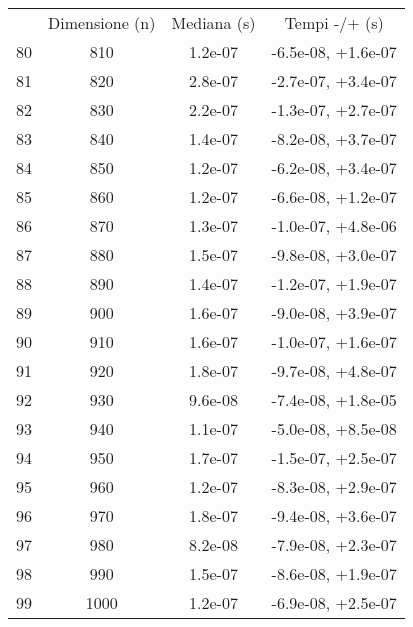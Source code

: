 \begin{table}
\centering
\begin{adjustbox}{width=1\textwidth/2}
\begin{tabular}{|c|c|c|c|}
\hline
 & Dimensione (n) & Mediana (s) & Tempi -/+ (s) \\
80 & 810 & 1.2e-07 & -6.5e-08, +1.6e-07 \\
\cline{1-4}
81 & 820 & 2.8e-07 & -2.7e-07, +3.4e-07 \\
\cline{1-4}
82 & 830 & 2.2e-07 & -1.3e-07, +2.7e-07 \\
\cline{1-4}
83 & 840 & 1.4e-07 & -8.2e-08, +3.7e-07 \\
\cline{1-4}
84 & 850 & 1.2e-07 & -6.2e-08, +3.4e-07 \\
\cline{1-4}
85 & 860 & 1.2e-07 & -6.6e-08, +1.2e-07 \\
\cline{1-4}
86 & 870 & 1.3e-07 & -1.0e-07, +4.8e-06 \\
\cline{1-4}
87 & 880 & 1.5e-07 & -9.8e-08, +3.0e-07 \\
\cline{1-4}
88 & 890 & 1.4e-07 & -1.2e-07, +1.9e-07 \\
\cline{1-4}
89 & 900 & 1.6e-07 & -9.0e-08, +3.9e-07 \\
\cline{1-4}
90 & 910 & 1.6e-07 & -1.0e-07, +1.6e-07 \\
\cline{1-4}
91 & 920 & 1.8e-07 & -9.7e-08, +4.8e-07 \\
\cline{1-4}
92 & 930 & 9.6e-08 & -7.4e-08, +1.8e-05 \\
\cline{1-4}
93 & 940 & 1.1e-07 & -5.0e-08, +8.5e-08 \\
\cline{1-4}
94 & 950 & 1.7e-07 & -1.5e-07, +2.5e-07 \\
\cline{1-4}
95 & 960 & 1.2e-07 & -8.3e-08, +2.9e-07 \\
\cline{1-4}
96 & 970 & 1.8e-07 & -9.4e-08, +3.6e-07 \\
\cline{1-4}
97 & 980 & 8.2e-08 & -7.9e-08, +2.3e-07 \\
\cline{1-4}
98 & 990 & 1.5e-07 & -8.6e-08, +1.9e-07 \\
\cline{1-4}
99 & 1000 & 1.2e-07 & -6.9e-08, +2.5e-07 \\
\cline{1-4}
\end{tabular}
\end{adjustbox}
\end{table}


